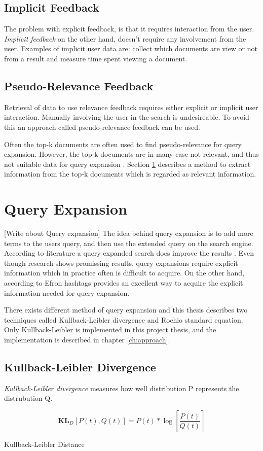 \subsection{Implicit Feedback}
The problem with explicit feedback, is that it requires interaction from the user.
\textit{Implicit feedback} on the other hand, doesn't require any involvement from the user.
Examples of implicit user data are:
collect which documents are view or not from a result and measure time spent viewing a document.

\subsection{Pseudo-Relevance Feedback}
Retrieval of data to use relevance feedback requires either explicit or implicit user interaction.
Manually involving the user in the search is undesireable.
To avoid this an approach called pseudo-relevance feedback can be used.

Often the top-k documents are often used to find pseudo-relevance for query expansion.
However, the top-k documents are in many case not relevant, and thus not suitable data for query expansion \cite{pseudo-relevance-invalid}.
Section \ref{sec:query-expansion} describes a method to extract information from the top-k documents which is regarded as relevant information.

\section{Query Expansion}
\label{sec:query-expansion}
[Write about Query expansion]
The idea behind query expansion is to add more terms to the users query, and then use the extended query on the search engine.
According to literature a query expanded search does improve the results \cite[ch. 5]{ir-book}.
Even though research shows promissing results, query expansions require explicit information which in practice often is difficult to acquire.
On the other hand, according to Efron \cite{ir-hashtag} hashtags provides an excellent way to acquire the explicit information needed for query expansion.

There exists different method of query expansion and this thesis describes two techniques called Kullback-Leibler divergence and Rochio standard equation.
Only Kullback-Leibler is implemented in this project thesis, and the implementation is described in chapter \ref{ch:approach}.

\subsection{Kullback-Leibler Divergence}
\textit{Kullback-Leibler divergence} measures how well distribution P represents the distrubution Q.

\begin{cequation}[H]
	\begin{equation}
	    \label{equ:line}
		\mathbf{KL}_D[P(t), Q(t)] = P(t)*\log{[\frac{P(t)}{Q(t)}]}
	\end{equation}
	\caption{Kullback-Leibler Distance}
  \label{kl-distance}
\end{cequation}
